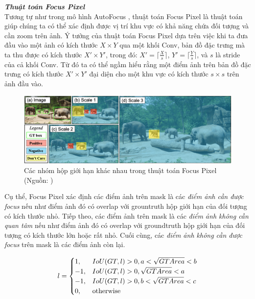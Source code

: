 {    \noindent
    \textbf{\textit{Thuật toán Focus Pixel}} \\
    Tương tự như trong mô hình AutoFocus \cite{najibi2019autofocus}, thuật toán Focus Pixel là thuật toán giúp chúng ta có thể xác định được vị trí khu vực có khả năng chứa đối tượng và cần zoom trên ảnh.
    Ý tưởng của thuật toán Focus Pixel  dựa trên việc khi ta đưa đầu vào một ảnh có kích thước $X \times Y$ qua một khối Conv, bản đồ đặc trưng mà ta thu được có kích thước $X' \times Y'$, trong đó: $X' = \lceil \frac{X}{s} \rceil$, $Y' = \lceil \frac{Y}{s} \rceil$, và $s$ là stride của cả khối Conv.
    Từ đó ta có thể ngầm hiểu rằng một điểm ảnh trên bản đồ đặc trưng có kích thước $X' \times Y'$ đại diện cho một khu vực có kích thước $s \times s$ trên ảnh đầu vào.

    \begin{figure}[H]
        \centering
        \includegraphics[width=15cm] {images/autofocus_focus_pixel}
        \caption{Các nhóm hộp giới hạn khác nhau trong thuật toán Focus Pixel (Nguồn: \cite{najibi2019autofocus})}
        \label{fig:autofocus_focus_pixel}
    \end{figure}

    \noindent
    Cụ thể, Focus Pixel  xác định các điểm ảnh trên mask là các \textit{điểm ảnh cần được focus} nếu như điểm ảnh đó có overlap với grountruth hộp giới hạn của đối tượng có kích thước nhỏ.
    Tiếp theo, các điểm ảnh trên mask là các \textit{điểm ảnh không cần quan tâm} nếu như điểm ảnh đó có overlap với groundtruth hộp giới hạn của đối tượng có kích thước lớn hoặc rất nhỏ.
    Cuối cùng, các \textit{điểm ảnh không cần được focus} trên mask là các điểm ảnh còn lại.

    \[l = 
        \begin{cases}
            1, & IoU\index{IoU}(GT, l) > 0, a < \sqrt{GTArea} < b \\
            -1, & IoU\index{IoU}(GT, l) > 0, \sqrt{GTArea} < a  \\
            -1, & IoU\index{IoU}(GT, l) > 0, b < \sqrt{GTArea} < c  \\
            0, & \text{otherwise}
        \end{cases}
    \]

}
